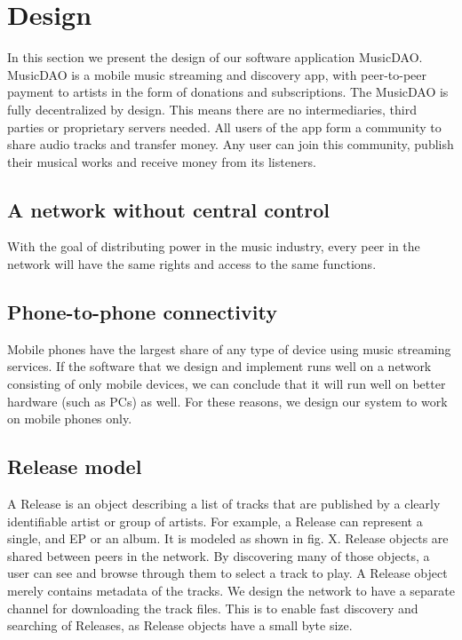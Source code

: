 \chapter{Design}
In this section we present the design of our software application MusicDAO. MusicDAO is a mobile music streaming and discovery app, with peer-to-peer payment to artists in the form of donations and subscriptions. The MusicDAO is fully decentralized by design. This means there are no intermediaries, third parties or proprietary servers needed. All users of the app form a community to share audio tracks and transfer money. Any user can join this community, publish their musical works and receive money from its listeners.

\section{A network without central control}
With the goal of distributing power in the music industry, every peer in the network will have the same rights and access to the same functions.

\section{Phone-to-phone connectivity}
Mobile phones have the largest share of any type of device using music streaming services. If the software that we design and implement runs well on a network consisting of only mobile devices, we can conclude that it will run well on better hardware (such as PCs) as well. For these reasons, we design our system to work on mobile phones only.

\section{Release model}
\label{sec:release-model}
A Release is an object describing a list of tracks that are published by a clearly identifiable artist or group of artists. For example, a Release can represent a single, and EP or an album. It is modeled as shown in fig. X. Release objects are shared between peers in the network. By discovering many of those objects, a user can see and browse through them to select a track to play. A Release object merely contains metadata of the tracks. We design the network to have a separate channel for downloading the track files. This is to enable fast discovery and
searching of Releases, as Release objects have a small byte size. 

